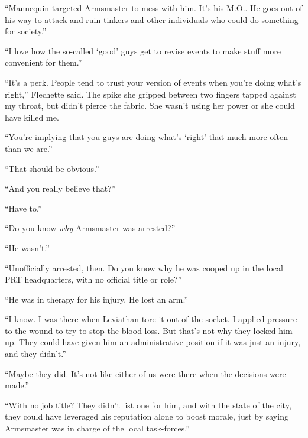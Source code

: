 ``Mannequin targeted Armsmaster to mess with him.  It's his M.O..  He goes out of his way to attack and ruin tinkers and other individuals who could do something for society.''



``I love how the so-called `good' guys get to revise events to make stuff more convenient for them.''



``It's a perk.  People tend to trust your version of events when you're doing what's right,'' Flechette said.  The spike she gripped between two fingers tapped against my throat, but didn't pierce the fabric.  She wasn't using her power or she could have killed me.



``You're implying that you guys are doing what's `right' that much more often than we are.''



``That should be obvious.''



``And you really believe that?''



``Have to.''



``Do you know \emph{why }Armsmaster was arrested?''



``He wasn't.''



``Unofficially arrested, then.  Do you know why he was cooped up in the local PRT headquarters, with no official title or role?''



``He was in therapy for his injury.  He lost an arm.''



``I know.  I was there when Leviathan tore it out of the socket.  I applied pressure to the wound to try to stop the blood loss.  But that's not why they locked him up.  They could have given him an administrative position if it was just an injury, and they didn't.''



``Maybe they did.  It's not like either of us were there when the decisions were made.''



``With no job title?  They didn't list one for him, and with the state of the city, they could have leveraged his reputation alone to boost morale, just by saying Armsmaster was in charge of the local task-forces.''



